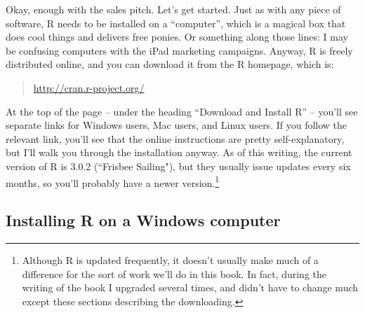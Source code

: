 \documentclass[
]{book}
\begin{document}
Okay, enough with the sales pitch. Let's get started. Just as with any piece of software, R needs to be installed on a ``computer'', which is a magical box that does cool things and delivers free ponies. Or something along those lines: I may be confusing computers with the iPad marketing campaigns. Anyway, R is freely distributed online, and you can download it from the R homepage, which is:

\begin{quote}
\url{http://cran.r-project.org/}
\end{quote}

At the top of the page -- under the heading ``Download and Install R'' -- you'll see separate links for Windows users, Mac users, and Linux users. If you follow the relevant link, you'll see that the online instructions are pretty self-explanatory, but I'll walk you through the installation anyway. As of this writing, the current version of R is 3.0.2 (``Frisbee Sailing"), but they usually issue updates every six months, so you'll probably have a newer version.\footnote{Although R is updated frequently, it doesn't usually make much of a difference for the sort of work we'll do in this book. In fact, during the writing of the book I upgraded several times, and didn't have to change much except these sections describing the downloading.}

\hypertarget{installing-r-on-a-windows-computer}{%
\subsection{Installing R on a Windows computer}\label{installing-r-on-a-windows-computer}}
\end{document}
